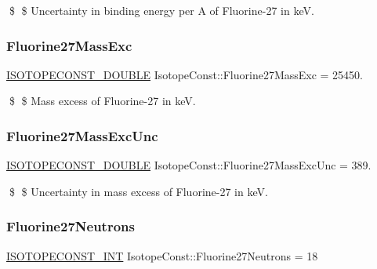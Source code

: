\$ \$ Uncertainty in binding energy per A of Fluorine-\/27 in keV. \mbox{\label{group___isotope_const-_fluorine-_f27_ga15699622341f37a3f5e33aacf74b177b}} 
\subsubsection{\texorpdfstring{Fluorine27\+Mass\+Exc}{Fluorine27MassExc}}
{\footnotesize\ttfamily \mbox{\hyperlink{group___isotope_const-_macros_ga8f45a7272ce02c0b4c65c44636ed719a}{I\+S\+O\+T\+O\+P\+E\+C\+O\+N\+S\+T\+\_\+\+D\+O\+U\+B\+LE}} Isotope\+Const\+::\+Fluorine27\+Mass\+Exc = 25450.}

\$ \$ Mass excess of Fluorine-\/27 in keV. \mbox{\label{group___isotope_const-_fluorine-_f27_gae44905084a7a6621633d0374041f198a}} 
\subsubsection{\texorpdfstring{Fluorine27\+Mass\+Exc\+Unc}{Fluorine27MassExcUnc}}
{\footnotesize\ttfamily \mbox{\hyperlink{group___isotope_const-_macros_ga8f45a7272ce02c0b4c65c44636ed719a}{I\+S\+O\+T\+O\+P\+E\+C\+O\+N\+S\+T\+\_\+\+D\+O\+U\+B\+LE}} Isotope\+Const\+::\+Fluorine27\+Mass\+Exc\+Unc = 389.}

\$ \$ Uncertainty in mass excess of Fluorine-\/27 in keV. \mbox{\label{group___isotope_const-_fluorine-_f27_ga48102be2a15de0bb5d4a53ef71f50b35}} 
\subsubsection{\texorpdfstring{Fluorine27\+Neutrons}{Fluorine27Neutrons}}
{\footnotesize\ttfamily \mbox{\hyperlink{group___isotope_const-_macros_ga5f18360b3e99483a35c32d789e62621c}{I\+S\+O\+T\+O\+P\+E\+C\+O\+N\+S\+T\+\_\+\+I\+NT}} Isotope\+Const\+::\+Fluorine27\+Neutrons = 18}

